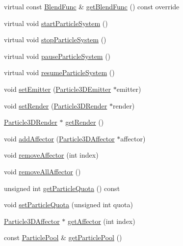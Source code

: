 \begin{DoxyCompactItemize}
\item 
virtual const \hyperlink{structBlendFunc}{Blend\+Func} \& \hyperlink{classParticleSystem3D_a23387a435e3bc2f567194a5e260a9e93}{get\+Blend\+Func} () const override
\item 
virtual void \hyperlink{classParticleSystem3D_a98d50249c6db65e0fb72dd7690965d83}{start\+Particle\+System} ()
\item 
virtual void \hyperlink{classParticleSystem3D_a93d4c960fa9d37cde714c482080dea4e}{stop\+Particle\+System} ()
\item 
virtual void \hyperlink{classParticleSystem3D_ac1e89d8e8e1d6203580a883a9cb665bf}{pause\+Particle\+System} ()
\item 
virtual void \hyperlink{classParticleSystem3D_aeafc5947c1937c3df634ab06235fc7bf}{resume\+Particle\+System} ()
\item 
void \hyperlink{classParticleSystem3D_aeb2593035516362a6e8209efdc8af68e}{set\+Emitter} (\hyperlink{classParticle3DEmitter}{Particle3\+D\+Emitter} $\ast$emitter)
\item 
void \hyperlink{classParticleSystem3D_abeb1c12eab97f24cd02adeb6453d6f2a}{set\+Render} (\hyperlink{classParticle3DRender}{Particle3\+D\+Render} $\ast$render)
\item 
\hyperlink{classParticle3DRender}{Particle3\+D\+Render} $\ast$ \hyperlink{classParticleSystem3D_a7ca1509df2a6890b503dc54dfa08a2b4}{get\+Render} ()
\item 
void \hyperlink{classParticleSystem3D_ae724cd8008b8ef3206659c4fedbf7339}{add\+Affector} (\hyperlink{classParticle3DAffector}{Particle3\+D\+Affector} $\ast$affector)
\item 
void \hyperlink{classParticleSystem3D_a159d6fc0ffeb25901b1836e86b5e3dc4}{remove\+Affector} (int index)
\item 
void \hyperlink{classParticleSystem3D_ab70f79480eab32ba5e32f36690809a9c}{remove\+All\+Affector} ()
\item 
unsigned int \hyperlink{classParticleSystem3D_a1304d9f882b2fb6e2db12d8067755c38}{get\+Particle\+Quota} () const
\item 
void \hyperlink{classParticleSystem3D_a6ab232323237daf0287d6d2e22089216}{set\+Particle\+Quota} (unsigned int quota)
\item 
\hyperlink{classParticle3DAffector}{Particle3\+D\+Affector} $\ast$ \hyperlink{classParticleSystem3D_ae6ada6195fe2ad8616385ecd370deaac}{get\+Affector} (int index)
\item 
const \hyperlink{classDataPool}{Particle\+Pool} \& \hyperlink{classParticleSystem3D_a195df72ace8428bc873d0838ebc02a2a}{get\+Particle\+Pool} ()

\end{DoxyCompactItemize}
